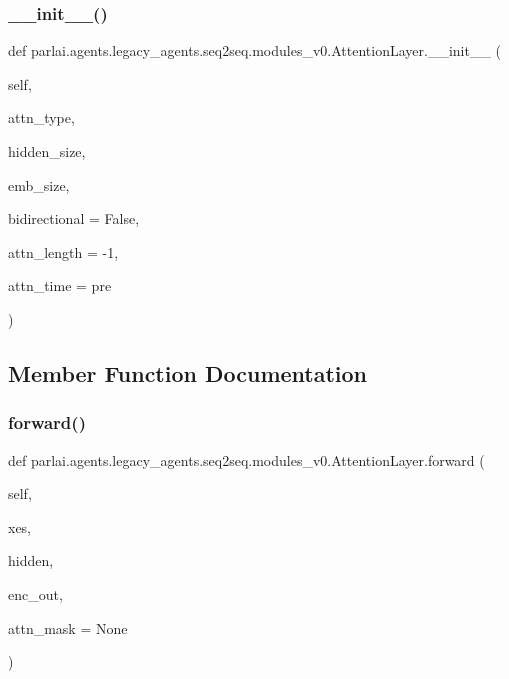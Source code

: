 \subsubsection{\texorpdfstring{\+\_\+\+\_\+init\+\_\+\+\_\+()}{\_\_init\_\_()}}
{\footnotesize\ttfamily def parlai.\+agents.\+legacy\+\_\+agents.\+seq2seq.\+modules\+\_\+v0.\+Attention\+Layer.\+\_\+\+\_\+init\+\_\+\+\_\+ (\begin{DoxyParamCaption}\item[{}]{self,  }\item[{}]{attn\+\_\+type,  }\item[{}]{hidden\+\_\+size,  }\item[{}]{emb\+\_\+size,  }\item[{}]{bidirectional = {\ttfamily False},  }\item[{}]{attn\+\_\+length = {\ttfamily -\/1},  }\item[{}]{attn\+\_\+time = {\ttfamily \textquotesingle{}pre\textquotesingle{}} }\end{DoxyParamCaption})}



\subsection{Member Function Documentation}
\mbox{\label{classparlai_1_1agents_1_1legacy__agents_1_1seq2seq_1_1modules__v0_1_1AttentionLayer_a6b5727eb84f3cab62adc1c647e23b98a}} 
\subsubsection{\texorpdfstring{forward()}{forward()}}
{\footnotesize\ttfamily def parlai.\+agents.\+legacy\+\_\+agents.\+seq2seq.\+modules\+\_\+v0.\+Attention\+Layer.\+forward (\begin{DoxyParamCaption}\item[{}]{self,  }\item[{}]{xes,  }\item[{}]{hidden,  }\item[{}]{enc\+\_\+out,  }\item[{}]{attn\+\_\+mask = {\ttfamily None} }\end{DoxyParamCaption})}



